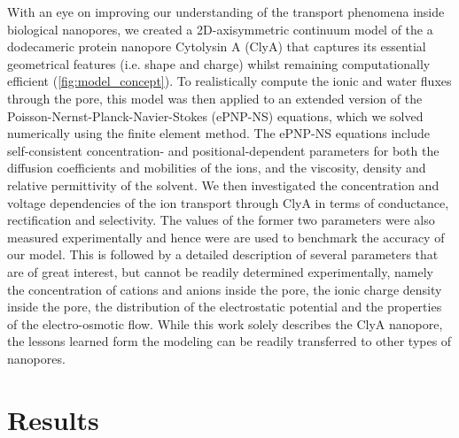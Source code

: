 \documentclass[journal=ancac3,manuscript=article,etalmode=truncate,maxauthors=0,layout=twocolumn]{achemso}
\begin{document}
With an eye on improving our understanding of the transport phenomena inside biological nanopores, we created 
a 2D-axisymmetric continuum model of the a dodecameric protein nanopore Cytolysin A (ClyA)\cite{Soskine-2013} 
that captures its essential geometrical features (i.e. shape and charge) whilst remaining computationally 
efficient (\cref{fig:model_concept}). To realistically compute the ionic and water fluxes through the pore, 
this model was then applied to an extended version of the Poisson-Nernst-Planck-Navier-Stokes (ePNP-NS) 
equations, which we solved numerically using the finite element method. The ePNP-NS equations include 
self-consistent concentration- and positional-dependent parameters for both the diffusion coefficients and 
mobilities of the ions, and the viscosity, density and relative permittivity of the solvent. We then 
investigated the concentration and voltage dependencies of the ion transport through ClyA in terms of 
conductance, rectification and selectivity. The values of the former two parameters were also measured 
experimentally and hence were are used to benchmark the accuracy of our model. This is followed by a detailed 
description of several parameters that are of great interest, but cannot be readily determined 
experimentally, namely the concentration of cations and anions inside the pore, the ionic charge density 
inside the pore, the distribution of the electrostatic potential and the properties of the electro-osmotic 
flow. While this work solely describes the ClyA nanopore, the lessons learned form the modeling can be 
readily transferred to other types of nanopores.

\section{Results}\label{sect:results}


\end{document}
